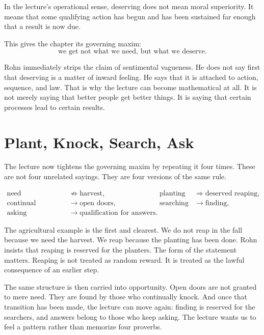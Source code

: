 \begin{definition}
In the lecture's operational sense, deserving does not mean moral superiority. It means that some qualifying action has begun and has been sustained far enough that a result is now due.
\end{definition}

This gives the chapter its governing maxim:
\begin{equation}
\text{we get not what we need, but what we deserve}.
\end{equation}

Rohn immediately strips the claim of sentimental vagueness. He does not say first that deserving is a matter of inward feeling. He says that it is attached to action, sequence, and law. That is why the lecture can become mathematical at all. It is not merely saying that better people get better things. It is saying that certain processes lead to certain results.

\section{Plant, Knock, Search, Ask}

The lecture now tightens the governing maxim by repeating it four times. These are not four unrelated sayings. They are four versions of the same rule.

\begin{align}
\text{need} &\not\Rightarrow \text{harvest}, &
\text{planting} &\Rightarrow \text{deserved reaping}, \\
\text{continual knocking} &\rightarrow \text{open doors}, &
\text{searching} &\rightarrow \text{finding}, \\
\text{asking} &\rightarrow \text{qualification for answers}. &&
\end{align}

The agricultural example is the first and clearest. We do not reap in the fall because we need the harvest. We reap because the planting has been done. Rohn insists that reaping is reserved for the planters. The form of the statement matters. Reaping is not treated as random reward. It is treated as the lawful consequence of an earlier step.

The same structure is then carried into opportunity. Open doors are not granted to mere need. They are found by those who continually knock. And once that transition has been made, the lecture can move again: finding is reserved for the searchers, and answers belong to those who keep asking. The lecture wants us to feel a pattern rather than memorize four proverbs.

